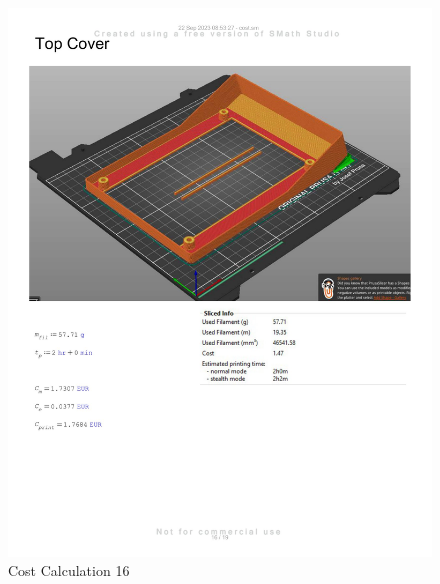 \begin{figure}[H]
    \centering
    \includegraphics[width=\linewidth]{texs/appendix/data/costcalculation/cost1-16.jpg}
    \caption{Cost Calculation 16}
    \label{fig:cost-calculation-16}
\end{figure}

